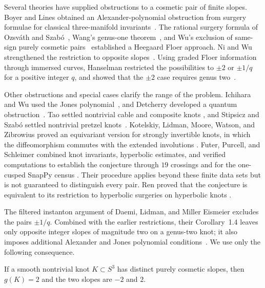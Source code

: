Several theories have supplied obstructions to a cosmetic pair of finite slopes.
Boyer and Lines obtained an Alexander-polynomial obstruction from
surgery formulae for classical three-manifold invariants~\cite{BL90}.
The rational surgery formula of Ozsv\'ath and Szab\'o~\cite{OS11},
Wang's genus-one theorem~\cite{Wang06}, and Wu's exclusion of
same-sign purely cosmetic pairs~\cite{Wu11} established a Heegaard
Floer approach.  Ni and Wu strengthened the restriction to opposite
slopes~\cite[Theorem~1.2]{NiWu2015}.  Using graded Floer information
through immersed curves, Hanselman restricted the possibilities to
$\pm2$ or $\pm1/q$ for a positive integer $q$, and showed that the
$\pm2$ case requires genus two~\cite[Theorem~2]{Hanselman2023}.

Other obstructions and special cases clarify the range of the problem.
Ichihara and Wu used the Jones polynomial~\cite{IchiharaWu2019},
and Detcherry developed a quantum obstruction~\cite{Detcherry2026}.
Tao settled nontrivial cable and composite knots
\cite{TaoCables2019,TaoConnected2022}, and Stipsicz and Szab\'o
settled nontrivial pretzel knots~\cite{StipsiczSzabo2021}.
Kotelskiy, Lidman, Moore, Watson, and Zibrowius proved an equivariant
version for strongly invertible knots, in which the diffeomorphism
commutes with the extended involutions
\cite{KotelskiyLidmanMooreWatsonZibrowius2024}.
Futer, Purcell, and Schleimer combined knot invariants, hyperbolic
estimates, and verified computations to establish the conjecture
through $19$ crossings and for the one-cusped SnapPy census
\cite{FuterPurcellSchleimer2025}.  Their procedure applies beyond
these finite data sets but is not guaranteed to distinguish every pair.
Ren proved that the conjecture is equivalent to its restriction to
hyperbolic surgeries on hyperbolic knots
\cite[Theorem~3, arXiv version~2]{Ren2025}.

The filtered instanton argument of Daemi, Lidman, and Miller Eismeier
excludes the pairs $\pm1/q$.  Combined with the earlier restrictions,
their Corollary~1.4 leaves only opposite integer slopes of magnitude
two on a genus-two knot; it also imposes additional Alexander and Jones
polynomial conditions~\cite{DaemiLidmanMillerEismeier2025}.
We use only the following consequence.

\begin{proposition}\label{prop:introduction:reduction}
If a smooth nontrivial knot $K\subset S^3$ has distinct purely cosmetic
slopes, then $g(K)=2$ and the two slopes are $-2$ and $2$.
\end{proposition}

